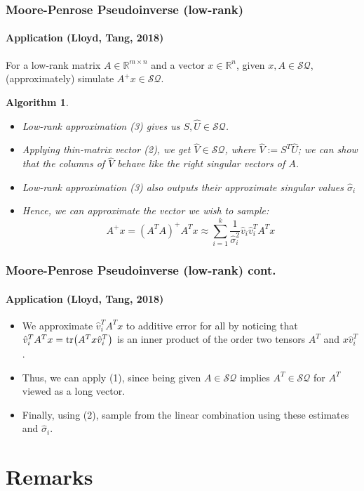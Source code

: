 \documentclass{beamer}
\newcommand\0{\mathbf{0}}
\newcommand\RR{\mathbb{R}}
\newcommand\<{\langle}
\renewcommand\>{\rangle}
\newtheorem{algorithm}{Algorithm}[theorem]
\begin{document}
\begin{frame}
\frametitle{Moore-Penrose Pseudoinverse (low-rank)} 	
\framesubtitle{Application (Lloyd, Tang, 2018)}

\begin{problem} For a low-rank matrix $A \in \RR^{m\times n}$
  and a vector $x \in \RR^n$, given $x, A \in \mathcal{SQ}$, (approximately) simulate $A^+x \in \mathcal{SQ}$.
\end{problem}
\pause
\begin{algorithm}   	
\begin{itemize}
\item Low-rank approximation (3) gives us $S,\hat{U} \in \mathcal{SQ}$.

\item Applying thin-matrix vector (2), we get $\hat{V} \in \mathcal{SQ}$, where $\hat{V} := S^T\hat{U}$; we can show that the columns of $\hat{V}$ behave like the right singular vectors of $A$. 

\item Low-rank approximation (3) also outputs their approximate singular values $\hat{\sigma}_i$
 
\item Hence, we can approximate the vector we wish to sample:
$$A^+x = (A^TA)^+A^Tx \approx \sum_{i=1}^k \frac{1}{\hat{\sigma}_i^2}\hat{v}_i\hat{v}_i^T A^Tx$$
\end{itemize}
\end{algorithm}
\end{frame}

\begin{frame}
\frametitle{Moore-Penrose Pseudoinverse (low-rank) cont.} 	
\framesubtitle{Application (Lloyd, Tang, 2018)}
\begin{itemize}
\item We approximate $\hat{v}_i^TA^Tx$ to additive error for all by noticing that $\hat{v}_i^TA^Tx = \tr(A^Tx\hat{v}_i^T)$ is an inner product of the order two tensors $A^T$ and $x\hat{v}_i^T$. 
\item Thus, we can apply (1), since being given $A \in \mathcal{SQ}$ implies $A^T \in \mathcal{SQ}$ for $A^T$ viewed as a long vector. 
\item Finally, using (2), sample from the linear combination using these estimates and $\hat{\sigma}_i$.	
\end{itemize}
\end{frame}

\section{Remarks}
\end{document}

